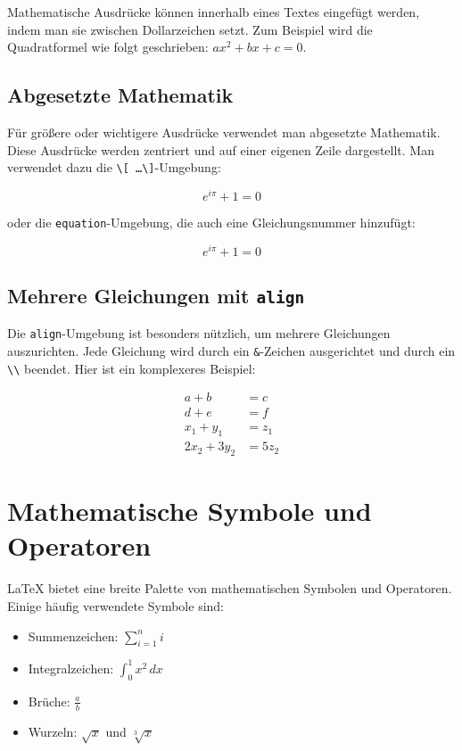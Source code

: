 Mathematische Ausdrücke können innerhalb eines Textes eingefügt werden, indem
man sie zwischen Dollarzeichen setzt. Zum Beispiel wird die Quadratformel wie
folgt geschrieben: \( ax^2 + bx + c = 0 \).

\subsection*{Abgesetzte Mathematik}

Für größere oder wichtigere Ausdrücke verwendet man abgesetzte Mathematik. Diese
Ausdrücke werden zentriert und auf einer eigenen Zeile dargestellt. Man
verwendet dazu die \texttt{\textbackslash[ \dots \textbackslash]}-Umgebung:

\[
e^{i\pi} + 1 = 0
\]

oder die \texttt{equation}-Umgebung, die auch eine Gleichungsnummer hinzufügt:

\begin{equation}
e^{i\pi} + 1 = 0
\end{equation}

\subsection*{Mehrere Gleichungen mit \texttt{align}}

Die \texttt{align}-Umgebung ist besonders nützlich, um mehrere Gleichungen
auszurichten. Jede Gleichung wird durch ein \texttt{\&}-Zeichen ausgerichtet und
durch ein \texttt{\textbackslash\textbackslash} beendet. Hier ist ein
komplexeres Beispiel:

\begin{align}
a + b &= c \\
d + e &= f \\
x_1 + y_1 &= z_1 \\
2x_2 + 3y_2 &= 5z_2
\end{align}

\section*{Mathematische Symbole und Operatoren}

\LaTeX{} bietet eine breite Palette von mathematischen Symbolen und Operatoren.
Einige häufig verwendete Symbole sind:

\begin{itemize}
    \item Summenzeichen: \(\sum_{i=1}^n i\)
    \item Integralzeichen: \(\int_0^1 x^2 \, dx\)
    \item Brüche: \(\frac{a}{b}\)
    \item Wurzeln: \(\sqrt{x}\) und \(\sqrt[3]{x}\)
\end{itemize}

